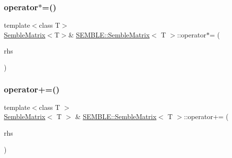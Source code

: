 \mbox{\label{structSEMBLE_1_1SembleMatrix_a977ecfbf1cc215db0349a3dc8b5f6069}} 
\subsubsection{\texorpdfstring{operator$\ast$=()}{operator*=()}\hspace{0.1cm}{\footnotesize\ttfamily [10/10]}}
{\footnotesize\ttfamily template$<$class T$>$ \\
\mbox{\hyperlink{structSEMBLE_1_1SembleMatrix}{Semble\+Matrix}}$<$T$>$\& \mbox{\hyperlink{structSEMBLE_1_1SembleMatrix}{S\+E\+M\+B\+L\+E\+::\+Semble\+Matrix}}$<$ T $>$\+::operator$\ast$= (\begin{DoxyParamCaption}\item[{const itpp\+::\+Mat$<$ T $>$ \&}]{rhs }\end{DoxyParamCaption})}

\mbox{\label{structSEMBLE_1_1SembleMatrix_a5936a2f5446365cd0eafb0ede754d392}} 
\subsubsection{\texorpdfstring{operator+=()}{operator+=()}\hspace{0.1cm}{\footnotesize\ttfamily [1/4]}}
{\footnotesize\ttfamily template$<$class T $>$ \\
\mbox{\hyperlink{structSEMBLE_1_1SembleMatrix}{Semble\+Matrix}}$<$ T $>$ \& \mbox{\hyperlink{structSEMBLE_1_1SembleMatrix}{S\+E\+M\+B\+L\+E\+::\+Semble\+Matrix}}$<$ T $>$\+::operator+= (\begin{DoxyParamCaption}\item[{const \mbox{\hyperlink{structSEMBLE_1_1SembleMatrix}{Semble\+Matrix}}$<$ T $>$ \&}]{rhs }\end{DoxyParamCaption})}


